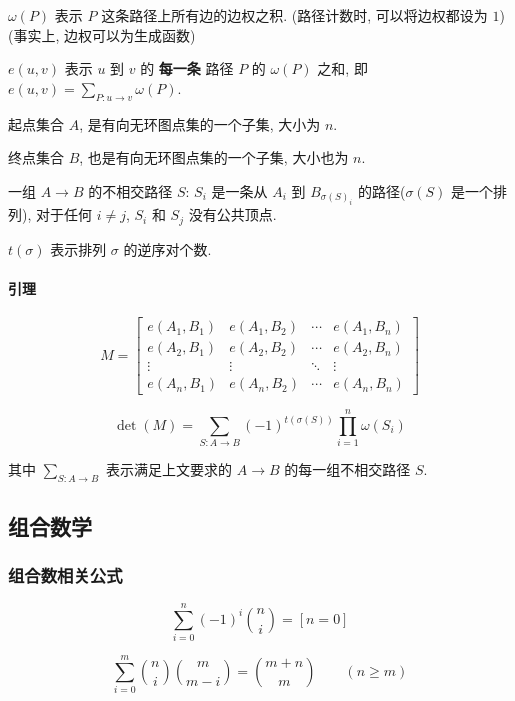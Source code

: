 \(\omega(P)\) 表示 \(P\) 这条路径上所有边的边权之积. (路径计数时, 可以将边权都设为 \(1\)) (事实上, 边权可以为生成函数)

\(e(u, v)\) 表示 \(u\) 到 \(v\) 的 \textbf{每一条} 路径 \(P\) 的 \(\omega(P)\) 之和, 即 \(e(u, v)=\sum\limits_{P:u\rightarrow v}\omega(P)\).

起点集合 \(A\), 是有向无环图点集的一个子集, 大小为 \(n\).

终点集合 \(B\), 也是有向无环图点集的一个子集, 大小也为 \(n\).

一组 \(A\rightarrow B\) 的不相交路径 \(S\): \(S_i\) 是一条从 \(A_i\) 到 \(B_{\sigma(S)_i}\) 的路径(\(\sigma(S)\) 是一个排列), 对于任何 \(i\ne j\), \(S_i\) 和 \(S_j\) 没有公共顶点.

\(t(\sigma)\) 表示排列 \(\sigma\) 的逆序对个数.

\paragraph{引理}

\[
    M = \begin{bmatrix}
        e(A_1,B_1) & e(A_1,B_2) & \cdots & e(A_1,B_n) \\
        e(A_2,B_1) & e(A_2,B_2) & \cdots & e(A_2,B_n) \\
        \vdots     & \vdots     & \ddots & \vdots     \\
        e(A_n,B_1) & e(A_n,B_2) & \cdots & e(A_n,B_n)
    \end{bmatrix}
\]

\[
    \det(M)=\sum\limits_{S:A\rightarrow B}(-1)^{t(\sigma(S))}\prod\limits_{i=1}^n \omega(S_i)
\]

其中 \(\sum\limits_{S:A\rightarrow B}\) 表示满足上文要求的 \(A\rightarrow B\) 的每一组不相交路径 \(S\).

\subsection{组合数学}

\subsubsection{组合数相关公式}

\begin{equation}
    \sum_{i=0}^n(-1)^i\binom{n}{i}=[n=0]
\end{equation}

\begin{equation}
    \sum_{i=0}^m \binom{n}{i}\binom{m}{m-i} = \binom{m+n}{m}\qquad(n \geq m)
\end{equation}

